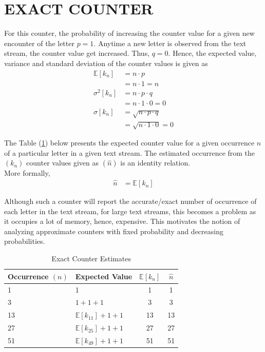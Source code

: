 \documentclass[longpaper, english, final, times]{revdetua}
\begin{document}
	 	
	\section{EXACT COUNTER}
		For this counter, the probability of increasing the counter value for a given new encounter of the letter $p=1$. Anytime a new letter is observed from the text stream, the counter value get increased. Thus, $q=0$.
		Hence, the expected value, variance and standard deviation of the counter values is given as
		\begin{align*}
			\mathbb{E}[k_n] &= n\cdot p\\
			&=n\cdot 1=n \\
			\sigma^2[k_n] &= n\cdot p\cdot q\\
			&=n\cdot 1 \cdot 0=0 \\
			\sigma[k_n] &= \sqrt{n\cdot p\cdot q}\\
			&=\sqrt{n\cdot 1\cdot 0}=0
		\end{align*}
		
		The Table (\ref{table:exactCounterExpectedEstimate}) below presents the expected counter value for a given occurrence $n$ of a particular letter in a given text stream. The estimated occurrence from the $(k_n)$ counter values given as $(\widehat{n})$ is an identity relation.\\
		More formally,
		\begin{align*}
			\widehat{n} &= \mathbb{E}[k_n]
		\end{align*}
		
		Although such a counter will report the accurate/exact number of occurrence of each letter in the text stream, for large text streams, this becomes a problem as it occupies a lot of memory, hence, expensive. This motivates the notion of analyzing approximate counters with fixed probability and decreasing probabilities.
		\begin{table}[ht!]
			\begin{center}
				\label{table:exactCounterExpectedEstimate}
				\caption{Exact Counter Estimates}	
				{\def\arraystretch{2}%
					\begin{tabular}{l|l|c|c}
						\toprule
						Occurrence $(n)$ & Expected Value& $\mathbb{E}[k_n]$ & $\hat{n}$\\
						\hline
						1 & 1 & 1 & 1\\
						3 & $1+1+1$&3 & 3\\
						13 & $\mathbb{E}[k_{11}]+1+1$&13& 13\\
						27 & $\mathbb{E}[k_{25}]+1+1$&27 & 27\\
						51 & $\mathbb{E}[k_{49}]+1+1$&51 & 51\\
						\bottomrule
					\end{tabular}
				}
			\end{center}
		\end{table}
	 	
\end{document}
